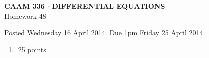 \documentclass[10pt]{article}
\begin{document}
\vspace*{-5em}
\begin{center}
\large \textsf{\textbf{CAAM 336 $\cdot$ DIFFERENTIAL EQUATIONS}\\[0.5em]
Homework 48 }
\end{center}

Posted Wednesday 16 April 2014.  Due 1pm Friday 25 April 2014.

\begin{enumerate}\addtocounter{enumi}{47}
\item {[25 points]}  
\end{enumerate}
\end{document}

